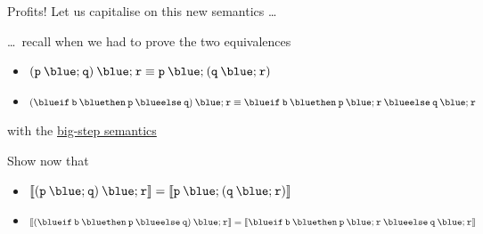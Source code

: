 \documentclass{beamer}
\begin{document}
\begin{frame}{Profits!}
        Let us capitalise on this new semantics \dots

        \dots\ recall when we had to prove the two equivalences
        \begin{itemize}
                \item $\mathtt{(p \> {\blue ;} \> q) \> {\blue ;} \> r} \equiv
                        \mathtt{p \> {\blue ;} \> (q \> {\blue ;} \> r)}$
                \item $\mathtt{({\blue if} \> b \> {\blue then} \> p \> {\blue else} \> q) 
                      \> {\blue ;} \> \prog{r}} \equiv 
                      \mathtt{{\blue if} \> b \> {\blue then} \> p \> {\blue ;} \> r \> 
                      {\blue else} \> q \> {\blue ;} \> r}$ 
        \end{itemize}
        with the \alert{\underline{big-step semantics}}

        \bigskip
        Show now that
        \begin{itemize}
                \item $\sem{\mathtt{(p \> {\blue ;} \> q) \> {\blue ;} \> r}} =
                        \sem{\mathtt{p \> {\blue ;} \> (q \> {\blue ;} \> r)}}$
                \item $\sem{\mathtt{({\blue if} \> b \> {\blue then} \> p \> {\blue else} \> q) 
                        \> {\blue ;} \> \prog{r}}} =
                      \sem{\mathtt{{\blue if} \> b \> {\blue then} \> p \> {\blue ;} \> r \> 
                      {\blue else} \> q \> {\blue ;} \> r}}$ 
        \end{itemize}

\end{frame}
\end{document}
